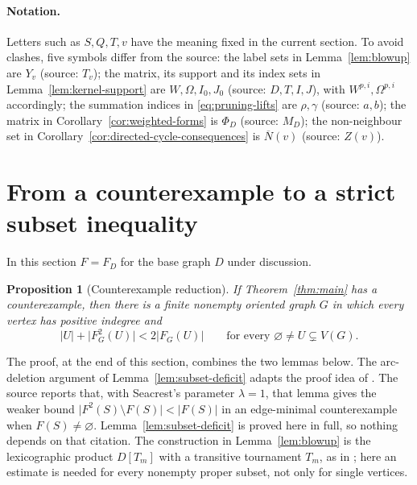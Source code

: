\documentclass[11pt]{article}
\newtheorem{proposition}[theorem]{Proposition}
\theoremstyle{remark}
\newcommand{\abs}[1]{\lvert #1\rvert}
\begin{document}
\paragraph{Notation.}
Letters such as $S,Q,T,v$ have the meaning fixed in the current section.
To avoid clashes, five symbols differ from the source: the label sets in
Lemma~\ref{lem:blowup} are $Y_v$ (source: $T_v$); the matrix, its support and
its index sets in Lemma~\ref{lem:kernel-support} are $W,\Omega,I_0,J_0$
(source: $D,T,I,J$), with $W^{p,i},\Omega^{p,i}$ accordingly; the summation
indices in \eqref{eq:pruning-lifts} are $\rho,\gamma$ (source: $a,b$); the
matrix in Corollary~\ref{cor:weighted-forms} is $\Phi_D$ (source: $M_D$); the
non-neighbour set in Corollary~\ref{cor:directed-cycle-consequences} is
$\overline N(v)$ (source: $Z(v)$).

\section{From a counterexample to a strict subset inequality}
\label{sec:reduction}

In this section $F=F_D$ for the base graph $D$ under discussion.

\begin{proposition}[Counterexample reduction]
\label{prop:counterexample-reduction}
If Theorem~\ref{thm:main} has a counterexample, then there is a finite
nonempty oriented graph $G$ in which every vertex has positive indegree
and
\begin{equation}
\label{eq:strict-subset-growth}
  \abs{U}+\abs{F_G^2(U)}<2\abs{F_G(U)}
  \qquad\text{for every }\varnothing\ne U\subsetneq V(G).
\end{equation}
\end{proposition}

The proof, at the end of this section, combines the two lemmas below.
The arc-deletion argument of Lemma~\ref{lem:subset-deficit} adapts the proof
idea of \cite[Lemma~4]{Seacrest2019}.  The source reports that, with
Seacrest's parameter $\lambda=1$, that lemma gives the weaker bound
$\abs{F^2(S)\setminus F(S)}<\abs{F(S)}$ in an edge-minimal counterexample
when $F(S)\neq\varnothing$.  Lemma~\ref{lem:subset-deficit} is proved here in
full, so nothing depends on that citation.  The construction in
Lemma~\ref{lem:blowup} is the lexicographic product $D[T_m]$ with a
transitive tournament $T_m$, as in
\cite[Theorem~4.3]{BrantnerBrockmanKaySnively2009}; here an estimate is
needed for every nonempty proper subset, not only for single vertices.
\end{document}
